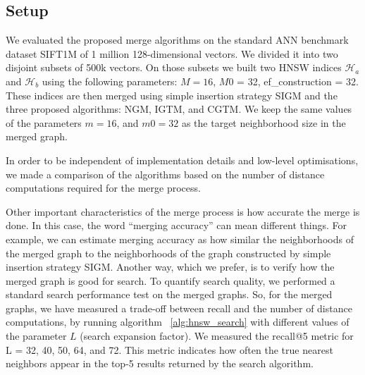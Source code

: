 \documentclass{article}
\begin{document}


\subsection{Setup}

We evaluated the proposed merge algorithms on the standard ANN benchmark dataset SIFT1M of 1 million 128-dimensional vectors. We divided it into two disjoint subsets of 500k vectors. On those subsets we built two HNSW indices $\mathcal{H}_a$ and $\mathcal{H}_b$ using the following parameters: $M = 16$, $M0$ = 32, ef\_construction = 32.
These indices are then merged using simple insertion strategy \textsc{SIGM} and the three proposed algorithms: \textsc{NGM}, \textsc{IGTM}, and \textsc{CGTM}. We keep the same values of the parameters $m = 16$, and $m0 = 32$ as the target neighborhood size in the merged graph.

In order to be independent of implementation details and low-level optimisations, we made a comparison of the algorithms based on the number of distance computations required for the merge process.

Other important characteristics of the merge process is how accurate the merge is done. In this case, the word ``merging accuracy'' can mean different things. For example, we can estimate merging accuracy as how similar the neighborhoods of the merged graph to the neighborhoods of the graph constructed by simple insertion strategy \textsc{SIGM}. 
Another way, which we prefer, is to verify how the merged graph is good for search. To quantify search quality, we performed a standard search performance test on the merged graphs. So, for the merged graphs, we have measured a trade-off between recall and the number of distance computations, by running algorithm ~\ref{alg:hnsw_search} with different values of the parameter $L$ (search expansion factor). We measured the recall@5 metric for L = 32, 40, 50, 64, and 72. This metric indicates how often the true nearest neighbors appear in the top-5 results returned by the search algorithm.
\end{document}
